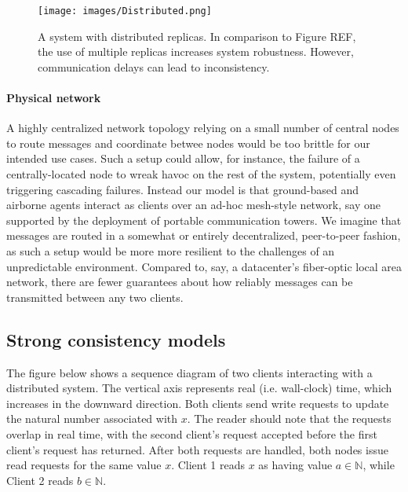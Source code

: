 \begin{figure}
  \texttt{[image: images/Distributed.png]}
  \caption{A system with distributed replicas. In comparison to Figure REF, the use of multiple replicas increases system robustness. However, communication delays can lead to inconsistency.}
\end{figure}


\paragraph{Physical network}

A highly centralized network topology relying on a small number of
central nodes to route messages and coordinate betwee nodes would be
too brittle for our intended use cases. Such a setup could allow, for
instance, the failure of a centrally-located node to wreak havoc on
the rest of the system, potentially even triggering cascading
failures. Instead our model is that ground-based and airborne agents
interact as clients over an ad-hoc mesh-style network, say one
supported by the deployment of portable communication towers. We
imagine that messages are routed in a somewhat or entirely
decentralized, peer-to-peer fashion, as such a setup would be more
more resilient to the challenges of an unpredictable
environment. Compared to, say, a datacenter's fiber-optic local area
network, there are fewer guarantees about how reliably messages can be
transmitted between any two clients.

\subsection{Strong consistency models}

The figure below shows a sequence diagram of two clients interacting
with a distributed system. The vertical axis represents real
(i.e. wall-clock) time, which increases in the downward
direction. Both clients send write requests to update the natural
number associated with $x$. The reader should note that the requests
overlap in real time, with the second client's request accepted before
the first client's request has returned. After both requests are
handled, both nodes issue read requests for the same value $x$. Client
1 reads $x$ as having value $a \in \mathbb{N}$, while Client 2 reads
$b \in \mathbb{N}$.

